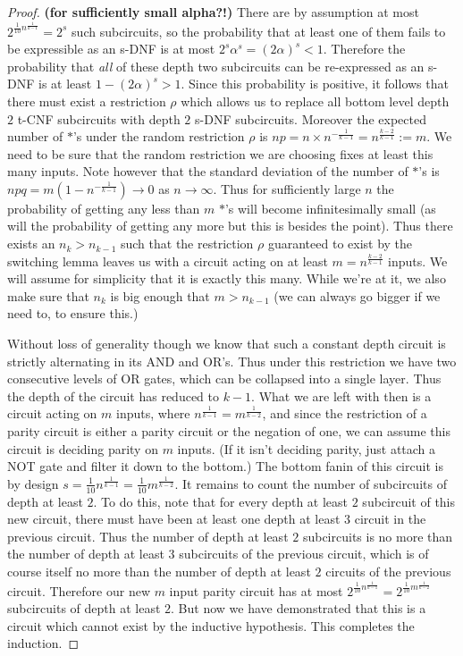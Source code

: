 \documentclass{article}
\theoremstyle{definition}
\theoremstyle{plain}
\theoremstyle{theorem}
\begin{document}
\begin{proof}
\textbf{(for sufficiently small alpha?!)} There are by assumption at most $2^{\frac{1}{10}n^{\frac{1}{k-1}}} = 2^s$ such subcircuits, so the probability that at least one of them fails to be expressible as an s-DNF is at most $2^s\alpha^s = (2\alpha)^s < 1$. Therefore the probability that \emph{all} of these depth two subcircuits can be re-expressed as an s-DNF is at least $1-(2\alpha)^s > 1$. Since this probability is positive, it follows that there must exist a restriction $\rho$ which allows us to replace all bottom level depth $2$ t-CNF subcircuits with depth $2$ s-DNF subcircuits.
Moreover the expected number of $*$'s under the random restriction $\rho$ is $np = n\times n^{-\frac{1}{k-1}} = n^{\frac{k-2}{k-1}} :=m$. We need to be sure that the random restriction we are choosing fixes at least this many inputs. Note however that the standard deviation of the number of $*$'s is $npq = m(1-n^{-\frac{1}{k-1}}) \to 0$ as $n \to \infty$. Thus for sufficiently large $n$ the probability of getting any less than $m$ $*$'s will become infinitesimally small (as will the probability of getting any more but this is besides the point). Thus there exists an $n_k > n_{k-1}$ such that the restriction $\rho$ guaranteed to exist by the switching lemma leaves us with a circuit acting on at least $m = n^{\frac{k-2}{k-1}}$ inputs. We will assume for simplicity that it is exactly this many. While we're at it, we also make sure that $n_k$ is big enough that $m > n_{k-1}$ (we can always go bigger if we need to, to ensure this.) \par 
Without loss of generality though we know that such a constant depth circuit is strictly alternating in its AND and OR's. Thus under this restriction we have two consecutive levels of OR gates, which can be collapsed into a single layer. Thus the depth of the circuit has reduced to $k-1$. What we are left with then is a circuit acting on $m$ inputs, where $n^{\frac{1}{k-1}} = m^{\frac{1}{k-2}}$, and since the restriction of a parity circuit is either a parity circuit or the negation of one, we can assume this circuit is deciding parity on $m$ inputs. (If it isn't deciding parity, just attach a NOT gate and filter it down to the bottom.) The bottom fanin of this circuit is by design $s = \frac{1}{10}n^{\frac{1}{k-1}} = \frac{1}{10}m^{\frac{1}{k-2}}$. It remains to count the number of subcircuits of depth at least $2$. To do this, note that for every depth at least $2$ subcircuit of this new circuit, there must have been at least one depth at least $3$ circuit in the previous circuit. Thus the number of depth at least $2$ subcircuits is no more than the number of depth at least $3$ subcircuits of the previous circuit, which is of course itself no more than the number of depth at least $2$ circuits of the previous circuit. Therefore our new $m$ input parity circuit has at most $2^{\frac{1}{10}n^{\frac{1}{k-1}}} = 2^{\frac{1}{10}m^{\frac{1}{k-2}}}$ subcircuits of depth at least $2$. But now we have demonstrated that this is a circuit which cannot exist by the inductive hypothesis. This completes the induction. 
\end{proof}
\end{document}
